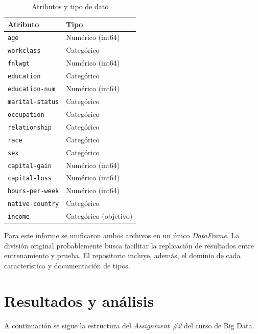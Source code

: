 \documentclass[12pt,a4paper]{article}
\begin{document}
\begin{table}[H]
  \centering
  \begin{tabular}{@{}ll@{}}
    \toprule
    \textbf{Atributo} & \textbf{Tipo} \\ \midrule
    \texttt{age}             & Numérico (int64) \\
    \texttt{workclass}       & Categórico \\
    \texttt{fnlwgt}          & Numérico (int64) \\
    \texttt{education}       & Categórico \\
    \texttt{education-num}   & Numérico (int64) \\
    \texttt{marital-status}  & Categórico \\
    \texttt{occupation}      & Categórico \\
    \texttt{relationship}    & Categórico \\
    \texttt{race}            & Categórico \\
    \texttt{sex}             & Categórico \\
    \texttt{capital-gain}    & Numérico (int64) \\
    \texttt{capital-loss}    & Numérico (int64) \\
    \texttt{hours-per-week}  & Numérico (int64) \\
    \texttt{native-country}  & Categórico \\
    \texttt{income}          & Categórico (objetivo) \\ \bottomrule
  \end{tabular}
  \caption{Atributos y tipo de dato}
  \label{tab:adult_attributes}
\end{table}

Para este informe se unificaron ambos archivos en un único \emph{DataFrame}. La división 
original probablemente busca facilitar la replicación de resultados entre entrenamiento y 
prueba. El repositorio incluye, además, el dominio de cada característica y documentación 
de tipos.

\section{Resultados y análisis}
A continuación se sigue la estructura del \textit{Assignment \#2} del curso de Big Data.
\end{document}
